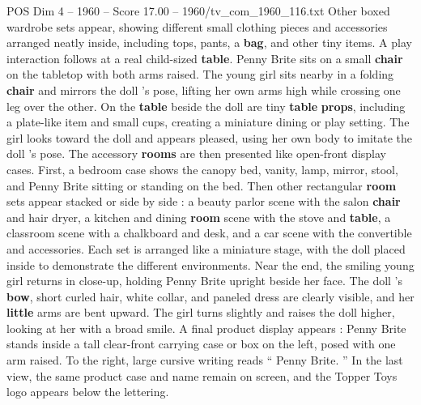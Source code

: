 \begin{textsample}{POS Dim 4 – 1960 – Score 17.00 – 1960/tv\_com\_1960\_116.txt}
Other boxed wardrobe sets appear, showing different small clothing pieces and accessories arranged neatly inside, including tops, pants, a \textbf{bag}, and other tiny items.
A play interaction follows at a real child-sized \textbf{table}.
Penny Brite sits on a small \textbf{chair} on the tabletop with both arms raised.
The young girl sits nearby in a folding \textbf{chair} and mirrors the doll ’s pose, lifting her own arms high while crossing one leg over the other.
On the \textbf{table} beside the doll are tiny \textbf{table} \textbf{props}, including a plate-like item and small cups, creating a miniature dining or play setting.
The girl looks toward the doll and appears pleased, using her own body to imitate the doll ’s pose.
The accessory \textbf{rooms} are then presented like open-front display cases.
First, a bedroom case shows the canopy bed, vanity, lamp, mirror, stool, and Penny Brite sitting or standing on the bed.
Then other rectangular \textbf{room} sets appear stacked or side by side : a beauty parlor scene with the salon \textbf{chair} and hair dryer, a kitchen and dining \textbf{room} scene with the stove and \textbf{table}, a classroom scene with a chalkboard and desk, and a car scene with the convertible and accessories.
Each set is arranged like a miniature stage, with the doll placed inside to demonstrate the different environments.
Near the end, the smiling young girl returns in close-up, holding Penny Brite upright beside her face.
The doll ’s \textbf{bow}, short curled hair, white collar, and paneled dress are clearly visible, and her \textbf{little} arms are bent upward.
The girl turns slightly and raises the doll higher, looking at her with a broad smile.
A final product display appears : Penny Brite stands inside a tall clear-front carrying case or box on the left, posed with one arm raised.
To the right, large cursive writing reads “ Penny Brite. ” In the last view, the same product case and name remain on screen, and the Topper Toys logo appears below the lettering.

\end{textsample}
